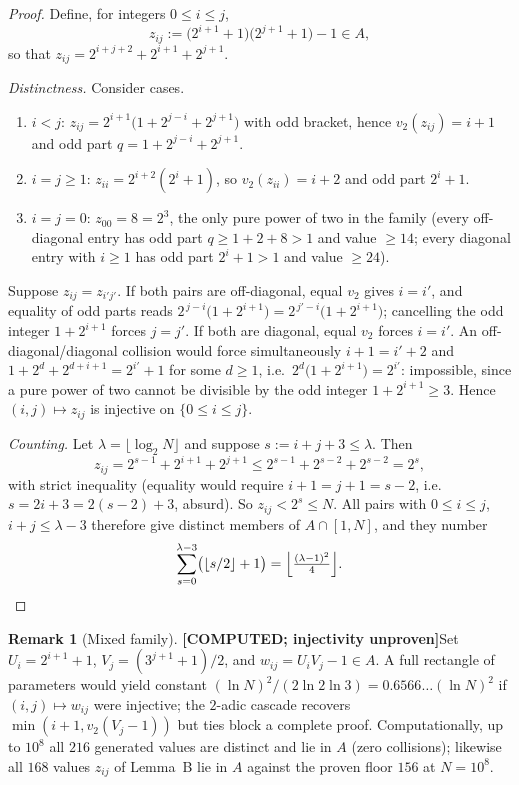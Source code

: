 \documentclass[11pt]{article}
\theoremstyle{definition}
\newtheorem{remark}[theorem]{Remark}
\newcommand{\A}{A}
\newcommand{\vtwo}{v_2}
\begin{document}
\begin{proof}
Define, for integers $0\le i\le j$,
\[
z_{ij}:=\bigl(2^{i+1}+1\bigr)\bigl(2^{j+1}+1\bigr)-1 \in \A ,
\]
so that $z_{ij}=2^{i+j+2}+2^{i+1}+2^{j+1}$.

\emph{Distinctness.} Consider cases.
\begin{enumerate}
\item $i<j$: $z_{ij}=2^{i+1}\bigl(1+2^{j-i}+2^{j+1}\bigr)$ with odd bracket,
hence $\vtwo(z_{ij})=i+1$ and odd part $q=1+2^{j-i}+2^{j+1}$.
\item $i=j\ge1$: $z_{ii}=2^{i+2}(2^i+1)$, so $\vtwo(z_{ii})=i+2$ and odd part
$2^i+1$.
\item $i=j=0$: $z_{00}=8=2^3$, the only pure power of two in the family (every
off-diagonal entry has odd part $q\ge1+2+8>1$ and value $\ge14$; every diagonal
entry with $i\ge1$ has odd part $2^i+1>1$ and value $\ge24$).
\end{enumerate}
Suppose $z_{ij}=z_{i'j'}$. If both pairs are off-diagonal, equal $\vtwo$ gives
$i=i'$, and equality of odd parts reads
$2^{\,j-i}\bigl(1+2^{i+1}\bigr)=2^{\,j'-i}\bigl(1+2^{i+1}\bigr)$; cancelling the
odd integer $1+2^{i+1}$ forces $j=j'$. If both are diagonal, equal $\vtwo$
forces $i=i'$. An off-diagonal/diagonal collision would force simultaneously
$i+1=i'+2$ and $1+2^{d}+2^{d+i+1}=2^{i'}+1$ for some $d\ge1$, i.e.\
$2^{d}\bigl(1+2^{i+1}\bigr)=2^{i'}$: impossible, since a pure power of two
cannot be divisible by the odd integer $1+2^{i+1}\ge3$. Hence
$(i,j)\mapsto z_{ij}$ is injective on $\{0\le i\le j\}$.

\emph{Counting.} Let $\lambda=\lfloor\log_2 N\rfloor$ and suppose
$s:=i+j+3\le\lambda$. Then
\[
z_{ij}=2^{s-1}+2^{i+1}+2^{j+1}
\le 2^{s-1}+2^{s-2}+2^{s-2}=2^s,
\]
with strict inequality (equality would require $i+1=j+1=s-2$, i.e.\
$s=2i+3=2(s-2)+3$, absurd). So $z_{ij}<2^s\le N$. All pairs with
$0\le i\le j$, $i+j\le\lambda-3$ therefore give distinct members of
$\A\cap[1,N]$, and they number
\[
\sum_{s=0}^{\lambda-3}\bigl(\lfloor s/2\rfloor+1\bigr)
=\Bigl\lfloor\tfrac{(\lambda-1)^2}{4}\Bigr\rfloor . \qedhere
\]
\end{proof}

\begin{remark}[Mixed family]\textbf{[COMPUTED; injectivity unproven]}\label{rem:mixed}
Set $U_i=2^{i+1}+1$, $V_j=(3^{j+1}+1)/2$, and $w_{ij}=U_iV_j-1\in\A$. A full
rectangle of parameters would yield constant
$(\ln N)^2/(2\ln2\ln3)=0.6566\ldots(\ln N)^2$ if $(i,j)\mapsto w_{ij}$ were
injective; the $2$-adic cascade recovers $\min(i+1,\vtwo(V_j-1))$ but ties block
a complete proof. Computationally, up to $10^8$ all $216$ generated values are
distinct and lie in $\A$ (zero collisions); likewise all $168$ values $z_{ij}$
of Lemma~B lie in $\A$ against the proven floor $156$ at $N=10^8$.
\end{remark}
\end{document}
